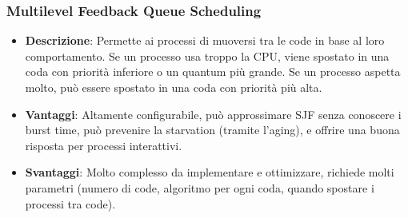 \subsubsection{Multilevel Feedback Queue Scheduling}
\begin{itemize}
    \item \textbf{Descrizione}: Permette ai processi di muoversi tra le code in base al loro comportamento. Se un processo usa troppo la CPU, viene spostato in una coda con priorità inferiore o un quantum più grande. Se un processo aspetta molto, può essere spostato in una coda con priorità più alta.
    \item \textbf{Vantaggi}: Altamente configurabile, può approssimare SJF senza conoscere i burst time, può prevenire la starvation (tramite l'aging), e offrire una buona risposta per processi interattivi.
    \item \textbf{Svantaggi}: Molto complesso da implementare e ottimizzare, richiede molti parametri (numero di code, algoritmo per ogni coda, quando spostare i processi tra code).
\end{itemize}